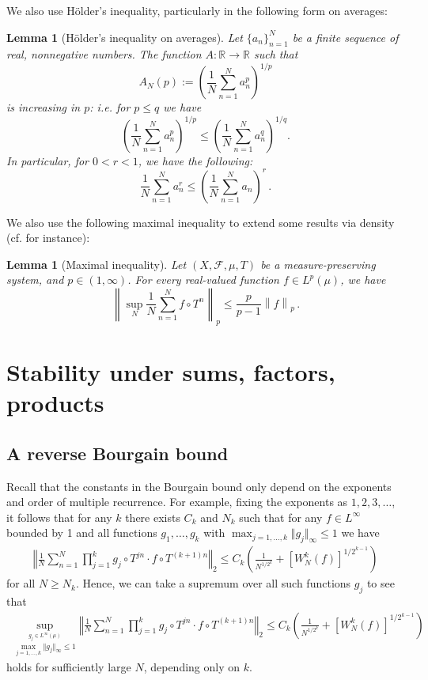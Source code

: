\documentclass[11pt, oneside]{amsart}   	%
\newcommand{\R}{\mathbb{R}}
\newcommand{\1}{\mathbbm{1}}
\newcommand{\norm}[1]{\left\lVert#1\right\rVert}
\newtheorem{lemma}[theorem]{Lemma}
\theoremstyle{definition}
\begin{document}
We also use Hölder's inequality, particularly in the following form on averages:
\begin{lemma}[Hölder's inequality on averages]
Let $\{a_n\}_{n=1}^N$ be a finite sequence of real, nonnegative numbers. The function $A: \R \to \R$ such that
$$A_N(p) := \left(\frac{1}{N}\sum_{n=1}^N a_n^p\right)^{1/p}$$
is increasing in $p$: i.e. for $p \leq q$ we have
$$\left(\frac{1}{N}\sum_{n=1}^N a_n^p\right)^{1/p}\leq \left(\frac{1}{N}\sum_{n=1}^N a_n^q\right)^{1/q}.$$
In particular, for $0 < r < 1$, we have the following:
$$ \frac{1}{N} \sum_{n=1}^N a_n^r \leq \left( \frac{1}{N} \sum_{n=1}^N a_n\right)^r\, .$$
\end{lemma}

We also use the following maximal inequality to extend some results via density (cf. \cite[Theorem 1.8]{AssaniWW} for instance):

\begin{lemma}[Maximal inequality]\label{L:maxIneq}
Let $(X, \mathcal{F}, \mu, T)$ be a measure-preserving system, and $p \in (1, \infty)$. For every real-valued function $f \in L^p(\mu)$, we have
\[ \norm{  \sup_N \frac{1}{N} \sum_{n=1}^N f \circ T^n}_p \leq \frac{p}{p-1} \norm{f}_p \, . \]
\end{lemma}




\section{Stability under sums, factors, products}\label{S:Stability}
\subsection{A reverse Bourgain bound}\label{s:RBB}

Recall that the constants in the Bourgain bound only depend on the exponents and order of multiple recurrence. For example, fixing the exponents as $1, 2, 3, \dots$, it follows that for any $k$ there exists $C_k$ and $N_k$ such that for any $f\in L^\infty$ bounded by 1 and all functions $g_1, \dots, g_k$ with $\max_{j=1, \dots, k} \Vert g_j \Vert_\infty \leq 1$ we have
\begin{align*}
\left\Vert \frac{1}{N}\sum_{n=1}^N \prod_{j=1}^{k} g_j \circ T^{jn} \cdot f\circ T^{(k+1)n}\right \Vert_2 \leq C_{k} \left( \frac{1}{N^{1/2^k}} + \left[W_N^k (f)\right]^{1/2^{k-1}} \right)
\end{align*}
for all $N \geq N_k$. Hence, we can take a supremum over all such functions $g_j$ to see that
\begin{align*}
\sup_{\overset{g_j\in L^\infty(\mu)}{\max_{j=1, \dots, k} \Vert g_j \Vert_\infty \leq 1}}\left\Vert \frac{1}{N}\sum_{n=1}^N \prod_{j=1}^{k} g_j \circ T^{jn} \cdot f\circ T^{(k+1)n}\right \Vert_2 \leq C_{k} \left( \frac{1}{N^{1/2^k}} + \left[W_N^k (f)\right]^{1/2^{k-1}} \right)
\end{align*}
holds for sufficiently large $N$, depending only on $k$.
\end{document}
